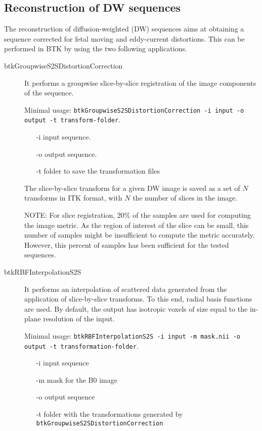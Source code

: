 \subsection{Reconstruction of DW sequences \cite{oubel_reconstruction_2010}}
\label{subsec:diff_rec}
The reconstruction of diffusion-weighted (DW) sequences aims at
obtaining a sequence corrected for fetal moving and eddy-current distortions.
This can be performed in BTK by using the two following applications. 
\begin{description}
\item[btkGroupwiseS2SDistortionCorrection] It performs a groupwise
slice-by-slice registration of the image components of the sequence.

Minimal usage: \texttt{btkGroupwiseS2SDistortionCorrection -i input -o
output -t transform-folder}.

\begin{itemize}
 \item[-i] input sequence.
 \item[-o] output sequence.
 \item[-t] folder to save the transformation files
\end{itemize}

The slice-by-slice transform for a given DW image is saved as a set of $N$
transforms in ITK format, with $N$ the number of slices in the image.

NOTE: For slice registration, 20\% of the samples are used for computing the
image metric. As the region of interest of the slice can be small, this number
of samples might be insufficient to compute the metric accurately. However,
this percent of samples has been sufficient for the tested sequences. 

\item[btkRBFInterpolationS2S] It performs an interpolation of scattered data
generated from the application of slice-by-slice transforms. To this end,
radial basis functions are used. By default, the output has isotropic
voxels of size equal to the in-plane resolution of the input.

Minimal usage: \texttt{btkRBFInterpolationS2S -i input -m mask.nii -o output
-t transformation-folder}.

\begin{itemize}
 \item[-i] input sequence
 \item[-m] mask for the B0 image
 \item[-o] output sequence 
 \item[-t] folder with the transformations generated by
\texttt{btkGroupwiseS2SDistortionCorrection}
\end{itemize}

\end{description}


